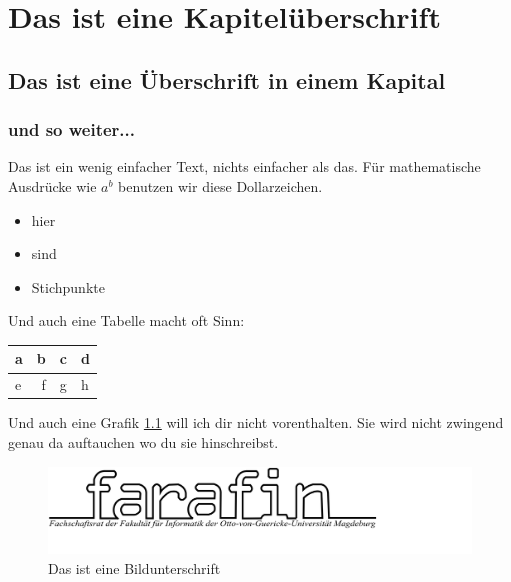 \chapter{Das ist eine Kapitelüberschrift}
\section{Das ist eine Überschrift in einem Kapital}
\subsection{und so weiter...}

Das ist ein wenig einfacher Text, nichts einfacher als das. Für mathematische Ausdrücke wie $a^b$ benutzen wir diese Dollarzeichen.

\begin{itemize}
	\item hier
	\item sind
	\item Stichpunkte
\end{itemize}

Und auch eine Tabelle macht oft Sinn:

\begin{tabular}{lrc|p{2cm}}
	a&b&c&d\\%
	\hline%
	e&f&g&h\\
\end{tabular}

Und auch eine Grafik \ref{soFindeIchDasBildWieder} will ich dir nicht vorenthalten. Sie wird nicht zwingend genau da auftauchen wo du sie hinschreibst.

\begin{figure}
	\includegraphics[scale=1]{images/farafin_logo_schwarz_auf_weiss.png}
	\caption{Das ist eine Bildunterschrift}
	\label{soFindeIchDasBildWieder}
\end{figure}